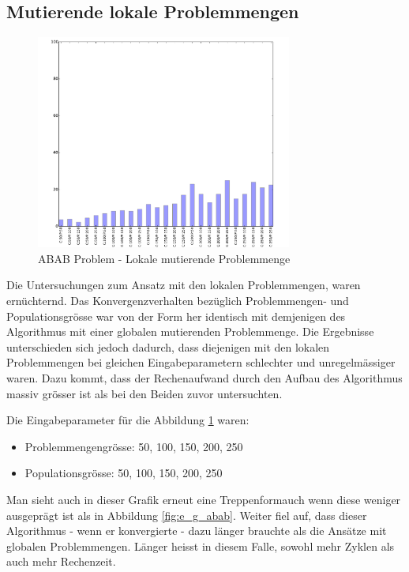 \subsection{Mutierende lokale Problemmengen}
\begin{figure}[h]
  \centering
  \includegraphics[width=0.75\textwidth]{images/E_L_abab_solved.pdf}
  \caption[ABAB Problem - Lokale mutierende Problemmenge]{ABAB Problem - Lokale mutierende Problemmenge}
  \label{fig:e_l_abab}
\end{figure}

Die Untersuchungen zum Ansatz mit den lokalen Problemmengen, waren ernüchternd. Das Konvergenzverhalten bezüglich Problemmengen- und Populationsgrösse war von der Form her identisch mit demjenigen des Algorithmus mit einer globalen mutierenden Problemmenge. Die Ergebnisse unterschieden sich jedoch dadurch, dass diejenigen mit den lokalen Problemmengen bei gleichen Eingabeparametern schlechter und unregelmässiger waren. Dazu kommt, dass der Rechenaufwand durch den Aufbau des Algorithmus massiv grösser ist als bei den Beiden zuvor untersuchten.

Die Eingabeparameter für die Abbildung \ref{fig:e_l_abab} waren:
\begin{itemize}
	\item Problemmengengrösse: 50, 100, 150, 200, 250
	\item Populationsgrösse: 50, 100, 150, 200, 250
\end{itemize}

Man sieht auch in dieser Grafik erneut eine \flqq Treppenform\frqq auch wenn diese weniger ausgeprägt ist als in Abbildung \ref{fig:e_g_abab}. Weiter fiel auf, dass dieser Algorithmus - wenn er konvergierte - dazu länger brauchte als die Ansätze mit globalen Problemmengen. Länger heisst in diesem Falle, sowohl mehr Zyklen als auch mehr Rechenzeit.
